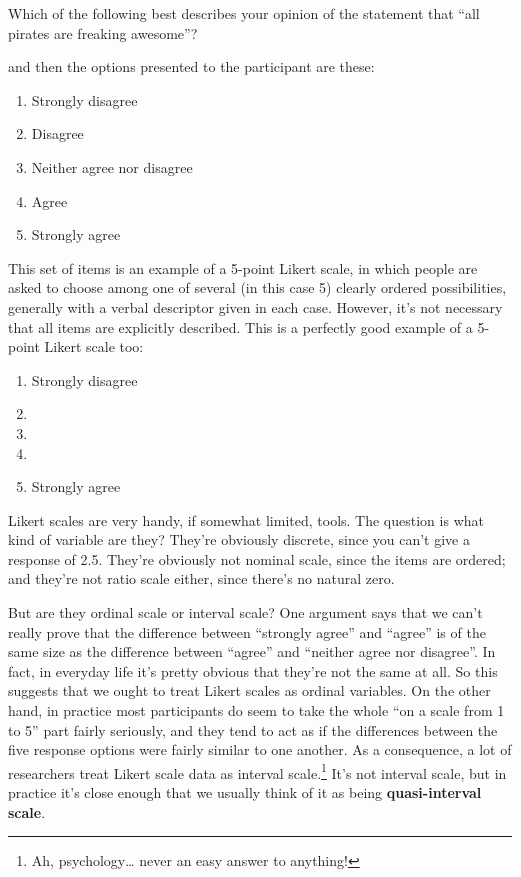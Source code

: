 \documentclass[
  letterpaper,
]{book}
\providecommand{\tightlist}{%
  \setlength{\itemsep}{0pt}\setlength{\parskip}{0pt}}\usepackage{longtable,booktabs,array}
\begin{document}
Which of the following best describes your opinion of the statement that
``all pirates are freaking awesome''?

and then the options presented to the participant are these:

\begin{enumerate}
\def\labelenumi{\arabic{enumi}.}
\tightlist
\item
  Strongly disagree
\item
  Disagree
\item
  Neither agree nor disagree
\item
  Agree
\item
  Strongly agree
\end{enumerate}

This set of items is an example of a 5-point Likert scale, in which
people are asked to choose among one of several (in this case 5) clearly
ordered possibilities, generally with a verbal descriptor given in each
case. However, it's not necessary that all items are explicitly
described. This is a perfectly good example of a 5-point Likert scale
too:

\begin{enumerate}
\def\labelenumi{\arabic{enumi}.}
\tightlist
\item
  Strongly disagree
\item
\item
\item
\item
  Strongly agree
\end{enumerate}

Likert scales are very handy, if somewhat limited, tools. The question
is what kind of variable are they? They're obviously discrete, since you
can't give a response of 2.5. They're obviously not nominal scale, since
the items are ordered; and they're not ratio scale either, since there's
no natural zero.

But are they ordinal scale or interval scale? One argument says that we
can't really prove that the difference between ``strongly agree'' and
``agree'' is of the same size as the difference between ``agree'' and
``neither agree nor disagree''. In fact, in everyday life it's pretty
obvious that they're not the same at all. So this suggests that we ought
to treat Likert scales as ordinal variables. On the other hand, in
practice most participants do seem to take the whole ``on a scale from 1
to 5'' part fairly seriously, and they tend to act as if the differences
between the five response options were fairly similar to one another. As
a consequence, a lot of researchers treat Likert scale data as interval
scale.\footnote{Ah, psychology\ldots{} never an easy answer to anything!}
It's not interval scale, but in practice it's close enough that we
usually think of it as being \textbf{quasi-interval scale}.
\end{document}
